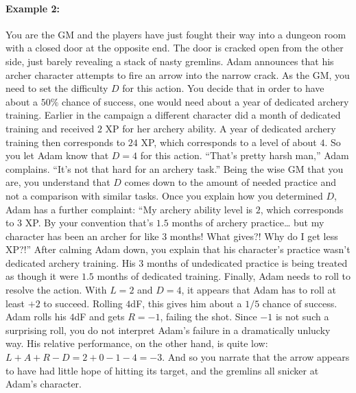 \paragraph{Example 2:} You are the GM and the players have just fought their way into a dungeon room with a closed door at the opposite end.
The door is cracked open from the other side, just barely revealing a stack of nasty gremlins.
Adam announces that his archer character attempts to fire an arrow into the narrow crack.
As the GM, you need to set the difficulty $D$ for this action.
You decide that in order to have about a $50\%$ chance of success, one would need about a year of dedicated archery training.
Earlier in the campaign a different character did a month of dedicated training and received $2$ XP for her archery ability.
A year of dedicated archery training then corresponds to $24$ XP, which corresponds to a level of about $4$.
So you let Adam know that $D=4$ for this action.
``That’s pretty harsh man,'' Adam complains.
``It’s not that hard for an archery task.''
Being the wise GM that you are, you understand that $D$ comes down to the amount of needed practice and not a comparison with similar tasks.
Once you explain how you determined $D$, Adam has a further complaint:
``My archery ability level is $2$, which corresponds to $3$ XP.
By your convention that’s $1.5$ months of archery practice… but my character has been an archer for like $3$ months!
What gives?!
Why do I get less XP?!'' After calming Adam down, you explain that his character’s practice wasn’t dedicated archery training.
His $3$ months of undedicated practice is being treated as though it were $1.5$ months of dedicated training.
Finally, Adam needs to roll to resolve the action.
With $L=2$ and $D=4$, it appears that Adam has to roll at least $+2$ to succeed.
Rolling $4$dF, this gives him about a $1/5$ chance of success.
Adam rolls his $4$dF and gets $R=-1$, failing the shot.
Since $-1$ is not such a surprising roll, you do not interpret Adam’s failure in a dramatically unlucky way.
His relative performance, on the other hand, is quite low: $L+A+R-D = 2+0-1-4 = -3$.
And so you narrate that the arrow appears to have had little hope of hitting its target,
and the gremlins all snicker at Adam’s character.
